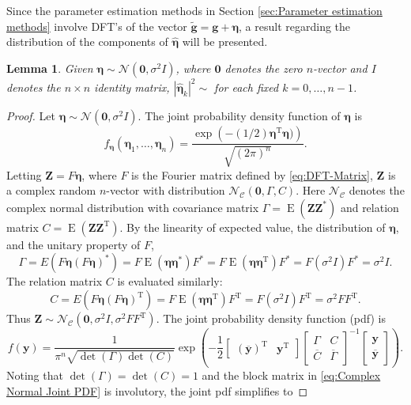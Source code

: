 \documentclass[12pt]{article}
\newcommand{\gdis}{\mathbf{g}}
\newcommand{\gnoise}{\widetilde{\mathbf{g}}}
\newcommand{\trans}{\mathrm{T}}	%
\newcommand{\ctrans}{*}	%
\newcommand{\noiseSD}{\sigma}	%
\newcommand{\noise}{\bm{\eta}}	%
\newcommand{\E}{\operatorname{E}}	%
\newtheorem*{lemma}{Lemma}
\begin{document}
Since the parameter estimation methods in Section \ref{sec:Parameter estimation methods} involve DFT's of the vector $\gnoise = \gdis + \noise$, a result regarding the distribution of the components of $\widehat{\noise}$ will be presented.
\begin{lemma}
Given $\noise \sim \mathcal{N}(\bm{0},\noiseSD^2I)$, where $\bm{0}$ denotes the zero $n$-vector and $I$ denotes the $n \times n$ identity matrix, $|\widehat{\noise}_k|^2 \sim$ for each fixed $k = 0,\ldots,n-1$.
\end{lemma}
\begin{proof}
Let $\noise \sim \mathcal{N}(\bm{0},\noiseSD^2I)$. The joint probability density function of $\noise$ is
\[f_{\noise}(\noise_1,\ldots,\noise_n) = \frac{\exp\left(-(1/2)\noise^\trans \noise)\right)}{\sqrt{(2\pi)^n}}.\]
Letting $\bm{Z} = F\noise$, where $F$ is the Fourier matrix defined by \eqref{eq:DFT-Matrix}, $\bm{Z}$ is a complex random $n$-vector with distribution $\mathcal{N}_\mathcal{C}(\bm{0},\Gamma,C)$. Here $\mathcal{N}_\mathcal{C}$ denotes the complex normal distribution with covariance matrix $\Gamma = \E(\bm{ZZ}^\ctrans)$ and relation matrix $C = \E(\bm{ZZ}^\trans)$. By the linearity of expected value, the distribution of $\noise$, and the unitary property of $F$, 
\[\Gamma = E(F\noise(F\noise)^\ctrans) = F\E(\noise\noise^\ctrans)F^\ctrans  = F\E(\noise\noise^\trans)F^\ctrans = F(\noiseSD^2I)F^\ctrans = \noiseSD^2I.\]
The relation matrix $C$ is evaluated similarly:
\[C = E(F\noise(F\noise)^\trans) = F\E(\noise\noise^\trans)F^\trans = F(\noiseSD^2I)F^\trans = \noiseSD^2FF^\trans.\]
Thus $\bm{Z} \sim \mathcal{N}_\mathcal{C}(\bm{0},\noiseSD^2I,\noiseSD^2FF^\trans)$. The joint probability density function (pdf) is
\begin{equation}
f(\bm{y}) = \frac{1}{\pi^n\sqrt{\det(\Gamma)\det(C)}}\exp\left(-\frac{1}{2}\begin{bmatrix}
(\overline{\bm{y}})^\trans & \bm{y}^\trans
\end{bmatrix}
\begin{bmatrix}
\Gamma & C \\
\overline{C} & \overline{\Gamma}
\end{bmatrix}^{-1} \begin{bmatrix}
\bm{y} \\
\overline{\bm{y}}
\end{bmatrix}
\right).
\label{eq:Complex Normal Joint PDF}
\end{equation}
Noting that $\det(\Gamma) = \det(C) = 1$ and the block matrix in \eqref{eq:Complex Normal Joint PDF} is involutory, the joint pdf simplifies to

\end{proof}
\end{document}
